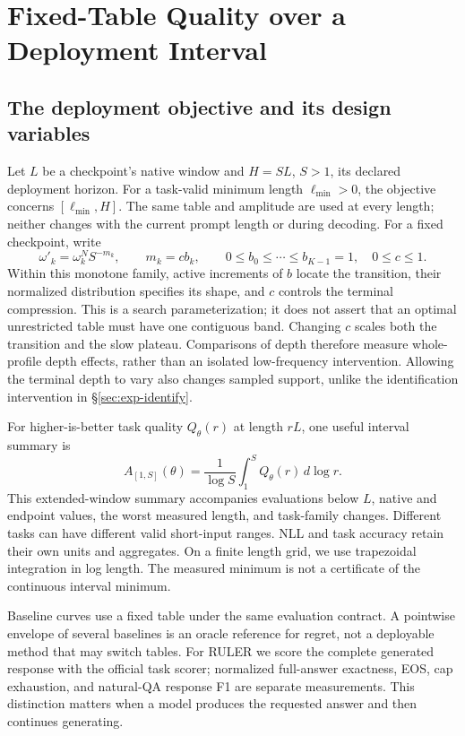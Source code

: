\section{Fixed-Table Quality over a Deployment Interval}
\label{sec:interval-design}

\subsection{The deployment objective and its design variables}

Let $L$ be a checkpoint's native window and $H=SL$, $S>1$, its declared deployment horizon. For a task-valid minimum length $\ell_{\min}>0$, the objective concerns $[\ell_{\min},H]$. The same table and amplitude are used at every length; neither changes with the current prompt length or during decoding. For a fixed checkpoint, write
\begin{equation}
\omega'_k=\omega^N_k S^{-m_k},\qquad m_k=c b_k,\qquad
0\le b_0\le\cdots\le b_{K-1}=1,\quad 0\le c\le1.
\label{eq:interval-variables}
\end{equation}
Within this monotone family, active increments of $b$ locate the transition, their normalized distribution specifies its shape, and $c$ controls the terminal compression. This is a search parameterization; it does not assert that an optimal unrestricted table must have one contiguous band. Changing $c$ scales both the transition and the slow plateau. Comparisons of depth therefore measure whole-profile depth effects, rather than an isolated low-frequency intervention. Allowing the terminal depth to vary also changes sampled support, unlike the identification intervention in \S\ref{sec:exp-identify}.

For higher-is-better task quality $Q_\theta(r)$ at length $rL$, one useful interval summary is
\begin{equation}
A_{[1,S]}(\theta)=\frac1{\log S}\int_1^S Q_\theta(r)\,d\log r.
\label{eq:interval-auc}
\end{equation}
This extended-window summary accompanies evaluations below $L$, native and endpoint values, the worst measured length, and task-family changes. Different tasks can have different valid short-input ranges. NLL and task accuracy retain their own units and aggregates. On a finite length grid, we use trapezoidal integration in log length. The measured minimum is not a certificate of the continuous interval minimum.

Baseline curves use a fixed table under the same evaluation contract. A pointwise envelope of several baselines is an oracle reference for regret, not a deployable method that may switch tables. For RULER we score the complete generated response with the official task scorer; normalized full-answer exactness, EOS, cap exhaustion, and natural-QA response F1 are separate measurements. This distinction matters when a model produces the requested answer and then continues generating.

